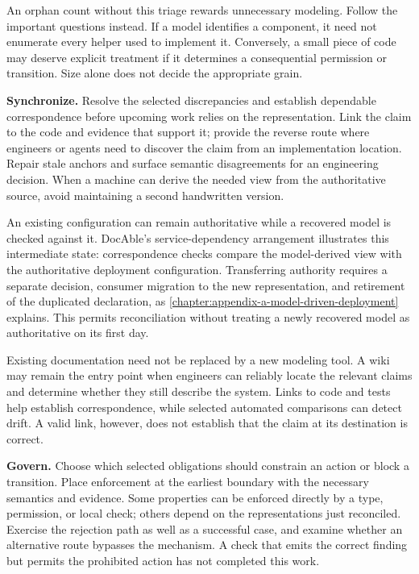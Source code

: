 An orphan count without this triage rewards unnecessary modeling. Follow the important questions instead. If a model identifies a component, it need not enumerate every helper used to implement it. Conversely, a small piece of code may deserve explicit treatment if it determines a consequential permission or transition. Size alone does not decide the appropriate grain.

\textbf{Synchronize.} Resolve the selected discrepancies and establish dependable correspondence before upcoming work relies on the representation. Link the claim to the code and evidence that support it; provide the reverse route where engineers or agents need to discover the claim from an implementation location. Repair stale anchors and surface semantic disagreements for an engineering decision. When a machine can derive the needed view from the authoritative source, avoid maintaining a second handwritten version.

An existing configuration can remain authoritative while a recovered model is checked against it. DocAble's service-dependency arrangement illustrates this intermediate state: correspondence checks compare the model-derived view with the authoritative deployment configuration. Transferring authority requires a separate decision, consumer migration to the new representation, and retirement of the duplicated declaration, as \autoref{chapter:appendix-a-model-driven-deployment} explains. This permits reconciliation without treating a newly recovered model as authoritative on its first day.

Existing documentation need not be replaced by a new modeling tool. A wiki may remain the entry point when engineers can reliably locate the relevant claims and determine whether they still describe the system. Links to code and tests help establish correspondence, while selected automated comparisons can detect drift. A valid link, however, does not establish that the claim at its destination is correct.

\textbf{Govern.} Choose which selected obligations should constrain an action or block a transition. Place enforcement at the earliest boundary with the necessary semantics and evidence. Some properties can be enforced directly by a type, permission, or local check; others depend on the representations just reconciled. Exercise the rejection path as well as a successful case, and examine whether an alternative route bypasses the mechanism. A check that emits the correct finding but permits the prohibited action has not completed this work.

